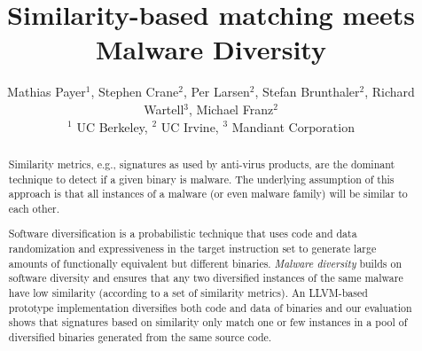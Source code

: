 \documentclass[letterpaper,twocolumn,10pt]{article}
\newcommand{\rtitle}{Similarity-based matching meets Malware Diversity}
\begin{document}

\def\sectionautorefname{Section}
\def\subsectionautorefname{Section}
\def\subsubsectionautorefname{Section}
\def\figureautorefname{Figure}
\def\lstlistingautorefname{Listing}

\date{}

\title{\rtitle}

\author{
Mathias Payer$^1$, Stephen Crane$^2$, Per Larsen$^2$, Stefan Brunthaler$^2$, Richard Wartell$^3$, Michael Franz$^2$ \\
$^1$ UC Berkeley, $^2$ UC Irvine, $^3$ Mandiant Corporation
} %
\maketitle



\begin{abstract}

Similarity metrics, e.g., signatures as used by anti-virus products, are the
dominant technique to detect if a given binary is malware. The underlying
assumption of this approach is that all instances of a malware (or even malware
family) will be similar to each other.

Software diversification is a probabilistic technique that uses code and data 
randomization and expressiveness in the target instruction set to generate large
amounts of functionally equivalent but different binaries. \emph{Malware
diversity} builds on software diversity and ensures that any two diversified
instances of the same malware have low similarity (according to a set of
similarity metrics). An LLVM-based prototype implementation diversifies both
code and data of binaries and our evaluation shows that signatures based on
similarity only match one or few instances in a pool of diversified binaries 
generated from the same source code.


\end{abstract}
\end{document}
